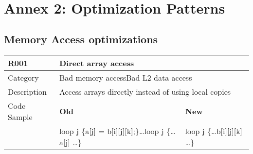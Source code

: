 \chapter{Annex 2: Optimization Patterns}
\label{ch:Optimization_Patterns}

\section{Memory Access optimizations}
\label{sec:Memory_Access_Optimizations}

\begin{tabular}{|p{0.9in}|p{2.0in}|p{2.0in}|} \hline
\textbf{R001}       & \multicolumn{2}{|p{4.0in}|}{\textbf{Direct array access}} \\ \hline
Category            & \multicolumn{2}{|p{4.0in}|}{Bad memory access\newline Bad L2 data access} \\ \hline
Description         & \multicolumn{2}{|p{4.0in}|}{Access arrays directly instead of using local copies} \\ \hline
Code Sample         & \textbf{Old}      & \textbf{New} \\ \hline
                    & loop j \{\newline   a[j] = b[i][j][k];\newline \}\newline \ldots\newline loop j \{\newline   \ldots a[j] \ldots\newline \}\newline
                    & loop j \{\newline   \ldots b[i][j][k] \ldots\newline \} \\ \hline
\end{tabular}

